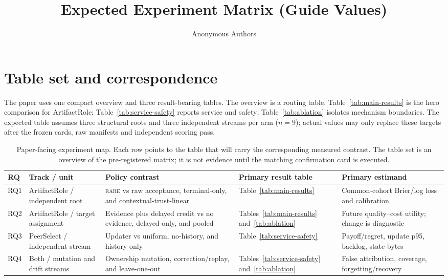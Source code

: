 \documentclass[sigconf,anonymous]{aamas}
\title[Expected Experiment Matrix]{Expected Experiment Matrix (Guide Values)}
\author{Anonymous Authors}
\affiliation{\institution{Internal research draft}}
\newcommand{\rare}{\textsc{rare}}
\begin{document}
\maketitle

\section{Table set and correspondence}

The paper uses one compact overview and three result-bearing tables. The overview is a routing table. Table~\ref{tab:main-results} is the hero comparison for ArtifactRole; Table~\ref{tab:service-safety} reports service and safety; Table~\ref{tab:ablation} isolates mechanism boundaries. The expected table assumes three structural roots and three independent streams per arm ($n=9$); actual values may only replace these targets after the frozen cards, raw manifests and independent scoring pass.

\begin{table}[t]
\centering
\small
\setlength{\tabcolsep}{3.5pt}
\renewcommand{\arraystretch}{1.12}
\begin{tabular}{p{}p{}p{}p{}p{}}
\toprule
RQ & Track / unit & Policy contrast & Primary result table & Primary estimand\\
\midrule
RQ1 & ArtifactRole / independent root & \rare{} vs raw acceptance, terminal-only, and contextual-trust-linear & Table~\ref{tab:main-results} & Common-cohort Brier/log loss and calibration\\
RQ2 & ArtifactRole / target assignment & Evidence plus delayed credit vs no evidence, delayed-only, and pooled & Tables~\ref{tab:main-results} and~\ref{tab:ablation} & Future quality--cost utility; change is diagnostic\\
RQ3 & PeerSelect / independent stream & Updater vs uniform, no-history, and history-only & Table~\ref{tab:service-safety} & Payoff/regret, update p95, backlog, state bytes\\
RQ4 & Both / mutation and drift streams & Ownership mutation, correction/replay, and leave-one-out & Tables~\ref{tab:service-safety} and~\ref{tab:ablation} & False attribution, coverage, forgetting/recovery\\
\bottomrule
\end{tabular}
\caption{Paper-facing experiment map. Each row points to the table that will carry the corresponding measured contrast. The table set is an overview of the pre-registered matrix; it is not evidence until the matching confirmation card is executed.}
\label{tab:overview}
\end{table}
\end{document}
